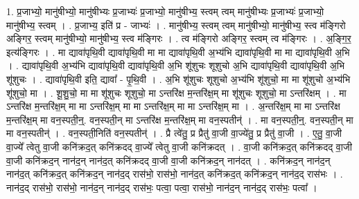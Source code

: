\documentclass[17pt]{extarticle}
\begin{document}
1. प्र॒जाभ्यो॒ मानु॑षीभ्यो॒ मानु॑षीभ्यः प्र॒जाभ्यः॑ प्र॒जाभ्यो॒ मानु॑षीभ्य॒ स्त्वम् त्वम् मानु॑षीभ्यः प्र॒जाभ्यः॑ प्र॒जाभ्यो॒ मानु॑षीभ्य॒ स्त्वम् । . प्र॒जाभ्य॒ इति॑ प्र - जाभ्यः॑ । . मानु॑षीभ्य॒ स्त्वम् त्वम् मानु॑षीभ्यो॒ मानु॑षीभ्य॒ स्त्व म॑ङ्गिरो अङ्गिर॒ स्त्वम् मानु॑षीभ्यो॒ मानु॑षीभ्य॒ स्त्व म॑ङ्गिरः । . त्व म॑ङ्गिरो अङ्गिर॒ स्त्वम् त्व म॑ङ्गिरः । . अ॒ङ्गि॒र॒ इत्य॑ङ्गिरः । . मा द्यावा॑पृथि॒वी द्यावा॑पृथि॒वी मा मा द्यावा॑पृथि॒वी अ॒भ्य॑भि द्यावा॑पृथि॒वी मा मा द्यावा॑पृथि॒वी अ॒भि । . द्यावा॑पृथि॒वी अ॒भ्य॑भि द्यावा॑पृथि॒वी द्यावा॑पृथि॒वी अ॒भि शू॑शुचः शूशुचो अ॒भि द्यावा॑पृथि॒वी द्यावा॑पृथि॒वी अ॒भि शू॑शुचः । . द्यावा॑पृथि॒वी इति॒ द्यावा᳚ - पृ॒थि॒वी । . अ॒भि शू॑शुचः शूशुचो अ॒भ्य॑भि शू॑शुचो॒ मा मा शू॑शुचो अ॒भ्य॑भि शू॑शुचो॒ मा । . शू॒शु॒चो॒ मा मा शू॑शुचः शूशुचो॒ मा ऽन्तरि॑क्ष म॒न्तरि॑क्ष॒म् मा शू॑शुचः शूशुचो॒ मा ऽन्तरि॑क्षम् । . मा ऽन्तरि॑क्ष म॒न्तरि॑क्ष॒म् मा मा ऽन्तरि॑क्ष॒म् मा मा ऽन्तरि॑क्ष॒म् मा मा ऽन्तरि॑क्ष॒म् मा । . अ॒न्तरि॑क्ष॒म् मा मा ऽन्तरि॑क्ष म॒न्तरि॑क्ष॒म् मा वन॒स्पती॒न्॒. वन॒स्पती॒न् मा ऽन्तरि॑क्ष म॒न्तरि॑क्ष॒म् मा वन॒स्पतीन्॑ । . मा वन॒स्पती॒न्॒. वन॒स्पती॒न् मा मा वन॒स्पतीन्॑ । . वन॒स्पती॒निति॑ वन॒स्पतीन्॑ । . प्रै त्वे॑तु॒ प्र प्रैतु॑ वा॒जी वा॒ज्ये॑तु॒ प्र प्रैतु॑ वा॒जी । . ए॒तु॒ वा॒जी वा॒ज्ये᳚ त्वेतु वा॒जी कनि॑क्रद॒त् कनि॑क्रदद् वा॒ज्ये᳚ त्वेतु वा॒जी कनि॑क्रदत् । . वा॒जी कनि॑क्रद॒त् कनि॑क्रदद् वा॒जी वा॒जी कनि॑क्रद॒न् नान॑द॒न् नान॑द॒त् कनि॑क्रदद् वा॒जी वा॒जी कनि॑क्रद॒न् नान॑दत् । . कनि॑क्रद॒न् नान॑द॒न् नान॑द॒त् कनि॑क्रद॒त् कनि॑क्रद॒न् नान॑द॒द् रास॑भो॒ रास॑भो॒ नान॑द॒त् कनि॑क्रद॒त् कनि॑क्रद॒न् नान॑द॒द् रास॑भः । . नान॑द॒द् रास॑भो॒ रास॑भो॒ नान॑द॒न् नान॑द॒द् रास॑भः॒ पत्वा॒ पत्वा॒ रास॑भो॒ नान॑द॒न् नान॑द॒द् रास॑भः॒ पत्वा᳚ । \newline
\end{document}
